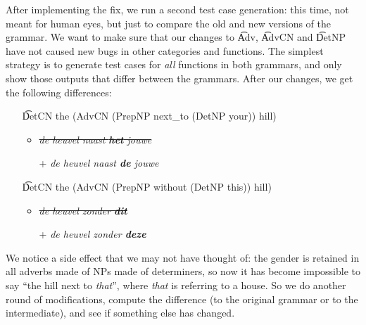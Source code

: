 After implementing the fix, we run a second test case generation: this
time, not meant for human eyes, but just to compare the old and new
versions of the grammar. We want to make sure that our changes 
to \t{Adv}, \t{AdvCN} and \t{DetNP} 
have not caused new bugs in other categories and functions. The
simplest strategy is to generate test cases for \emph{all} functions
in both grammars, and only show those outputs that differ between the
grammars. After our changes, we get the following differences: 

\begin{itemize}
\item[] \t{DetCN the (AdvCN (PrepNP next\_to (DetNP your)) hill)}
  \begin{itemize}
   \item \emph{\sout{de heuvel naast {\bf  het} jouwe}}
   \item[+] \emph{de heuvel naast {\bf  de} jouwe}
  \end{itemize}
\item[] \t{DetCN the (AdvCN (PrepNP without (DetNP this)) hill)}
  \begin{itemize}
   \item \emph{\sout{de heuvel zonder {\bf  dit}}}
   \item[+] \emph{de heuvel zonder {\bf  deze}}
  \end{itemize}
\end{itemize}

\noindent We notice a side effect that we may not have thought of: the
gender is retained in all adverbs made of NPs made of determiners, so
now it has become impossible to say ``the hill next to \emph{that}'',
where \emph{that} is referring to a house. So we do another round of
modifications, compute the difference (to the original grammar or to
the intermediate), and see if something else has changed.


